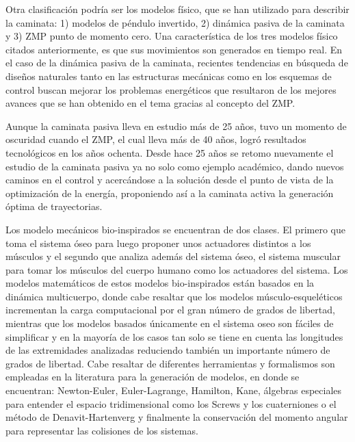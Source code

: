 Otra clasificaci\'on podr\'ia ser los modelos físico, que se han utilizado para describir la caminata\cite{Xiang2010}: 1) modelos de p\'endulo invertido, 2) din\'amica pasiva de la caminata y 3) ZMP punto de momento cero. Una caracter\'istica de los tres modelos f\'isico citados anteriormente, es que sus movimientos son generados en tiempo real\cite{Xiang2010}. En el caso de la din\'amica pasiva de la caminata, recientes tendencias en b\'usqueda de dise\~nos naturales tanto en las estructuras mec\'anicas como en los esquemas de control buscan mejorar los problemas energ\'eticos que resultaron de los mejores avances que se han obtenido en el tema gracias al concepto del ZMP\cite{Xiang2010}.\par
Aunque la caminata pasiva lleva en estudio m\'as de 25 a\~nos, tuvo un momento de oscuridad cuando el ZMP, el cual lleva m\'as de 40 a\~nos, logr\'o resultados tecnol\'ogicos en los a\~nos ochenta\cite{Vukobratovic2004}. Desde hace 25 a\~nos se retomo nuevamente el estudio de la caminata pasiva ya no solo como ejemplo acad\'emico\cite{McGeer1990a}, dando nuevos caminos en el control y acerc\'andose a la soluci\'on desde el punto de vista de la optimizaci\'on de la energ\'ia\cite{Goswami1996}, proponiendo as\'i a la caminata activa la generaci\'on \'optima de trayectorias\cite{Gregg2010}.\par
Los modelo mec\'anicos bio-inspirados se encuentran de dos clases\cite{Xiang2010}. El primero que toma el sistema \'oseo para luego proponer unos actuadores distintos a los músculos\cite{Wang2012} y el segundo que analiza adem\'as del sistema \'oseo, el sistema muscular para tomar los m\'usculos del cuerpo humano como los actuadores del sistema\cite{Kang2013,Roa2006}. Los modelos matem\'aticos de estos modelos bio-inspirados est\'an basados en la din\'amica multicuerpo\cite{Xiang2010}, donde cabe resaltar que los modelos m\'usculo-esquel\'eticos incrementan la carga computacional por el gran n\'umero de grados de libertad\cite{Xiang2010}, mientras que los modelos basados \'unicamente en el sistema oseo son f\'aciles de simplificar y en la mayor\'ia de los casos tan solo se tiene en cuenta las longitudes de las extremidades analizadas reduciendo también un importante n\'umero de grados de libertad\cite{McGeer1990a}. Cabe resaltar de diferentes herramientas y formalismos son empleadas en la literatura para la generaci\'on de modelos, en donde se encuentran: Newton-Euler, Euler-Lagrange, Hamilton, Kane, \'algebras especiales para entender el espacio tridimensional como los Screws y los cuaterniones o el método de Denavit-Hartenverg y finalmente la conservaci\'on del momento angular para representar las colisiones de los sistemas.\par
